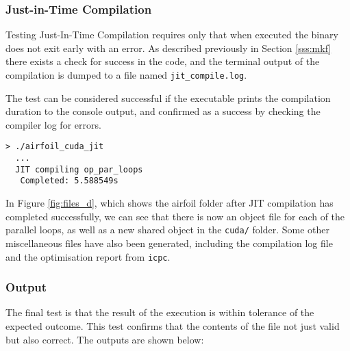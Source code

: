 \subsubsection{Just-in-Time Compilation}
\label{sss:jit_comp}
Testing Just-In-Time Compilation requires only that when executed the binary does not exit early with an error. As described previously in Section \ref{sss:mkf} there exists a check for success in the code, and the terminal output of the compilation is dumped to a file named \verb|jit_compile.log|.
\par
The test can be considered successful if the executable prints the compilation duration to the console output, and confirmed as a success by checking the compiler log for errors.
\begin{verbatim}
> ./airfoil_cuda_jit
  ...
  JIT compiling op_par_loops
   Completed: 5.588549s
\end{verbatim}
In Figure \ref{fig:files_d}, which shows the airfoil folder after JIT compilation has completed successfully, we can see that there is now an object file for each of the parallel loops, as well as a new shared object in the \verb|cuda/| folder. Some other miscellaneous files have also been generated, including the compilation log file and the optimisation report from \verb|icpc|.

\subsubsection{Output}
The final test is that the result of the execution is within tolerance of the expected outcome. This test confirms that the contents of the file not just valid but also correct. The outputs are shown below:

